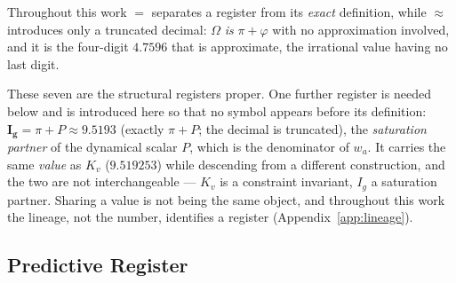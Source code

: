 \documentclass[12pt,a4paper]{article}
\begin{document}
Throughout this work $=$ separates a register from its \emph{exact} definition, while $\approx$ introduces only a truncated decimal: $\Omega$ \emph{is} $\pi+\varphi$ with no approximation involved, and it is the four-digit $4.7596$ that is approximate, the irrational value having no last digit.

These seven are the structural registers proper. One further register is needed
below and is introduced here so that no symbol appears before its definition:
$\boldsymbol{I_g}=\pi+P\approx9.5193$ (exactly $\pi+P$; the decimal is truncated), the \emph{saturation partner} of the
dynamical scalar $P$, which is the denominator of $w_a$. It carries the same
\emph{value} as $K_v$ ($9.519253$) while descending from a different
construction, and the two are not interchangeable --- $K_v$ is a constraint
invariant, $I_g$ a saturation partner. Sharing a value is not being the same
object, and throughout this work the lineage, not the number, identifies a
register (Appendix~\ref{app:lineage}).

\subsection{Predictive Register}
\label{sec:register}
\end{document}
